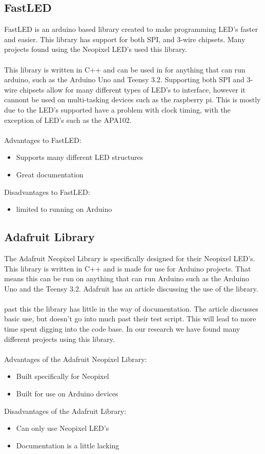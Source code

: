 \documentclass[onecolumn, draftclsnofoot,10pt, compsoc]{IEEEtran}
\begin{document}
		\subsection{FastLED}
		FastLED is an arduino based library created to make programming LED's
		faster and easier. This library has support for both SPI, and 3-wire
		chipsets\cite[Pg 2]{fastLED}. Many projects found using the Neopixel LED's
		used this library.
		\\\\
		This library is written in C++ and can be used in for anything that can run
		arduino, such as the Arduino Uno and Teensy 3.2. Supporting both SPI and
		3-wire chipsets allow for many different types of LED's to interface,
		however it cannont be used on multi-tasking devices such as the raspberry
		pi. This is mostly due to the LED's supported have a problem with clock
		timing, with the exception of LED's such as the APA102.
		\\\\
		Advantages to FastLED:
		\begin{itemize}
			\item Supports many different LED structures
			\item Great documentation
		\end{itemize}
		Disadvantages to FastLED:
		\begin{itemize}
			\item limited to running on Arduino
		\end{itemize}
		\subsection{Adafruit Library}
		The Adafruit Neopixel Library is specifically designed for their Neopixel
		LED's. This library is written in C++ and is made for use for Arduino
		projects. That means this can be run on anything that can run Arduino such
		as the Arduino Uno and the Teensy 3.2. Adafruit has an article discussing
		the use of the library\cite[Pg 2]{neolib}.
		\\\\
		past this the library has little in the way of documentation. The article
		discusses basic use, but doesn't go into much past their test script. This
		will lead to more time spent digging into the code base. In our research we
		have found many different projects using this library.
		\\\\
		Advantages of the Adafruit Neopixel Library:
		\begin{itemize}
			\item Built specifically for Neopixel
			\item Built for use on Arduino devices
		\end{itemize}
		Disadvantages of the Adafruit Library:
		\begin{itemize}
			\item Can only use Neopixel LED's
			\item Documentation is a little lacking
		\end{itemize}
\end{document}
